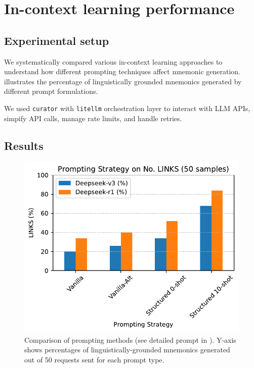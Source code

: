 

\section{In-context learning performance} \label{sec:icl-performance}

\subsection{Experimental setup}
We systematically compared various in-context learning approaches to understand how different prompting techniques affect mnemonic generation.  illustrates the percentage of linguistically grounded mnemonics generated by different prompt formulations.

We used \verb|curator| \citep{BespokeLabBESPOKE2025} with \verb|litellm| orchestration layer to interact with LLM APIs, simpify API calls, manage rate limits, and handle retries.

\subsection{Results}

\begin{figure}
  \centering
  \includegraphics[width=\linewidth]{figures/prompt_comparison.pdf}
  \caption{Comparison of prompting methods (see detailed prompt in ). Y-axis shows percentages of linguistically-grounded mnemonics generated out of 50 requests sent for each prompt type.}
  \label{fig:prompting-methods}
\end{figure}

